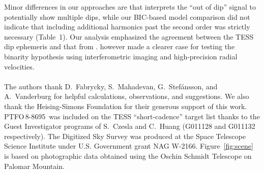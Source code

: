 \documentclass[12pt,twocolumn,tighten]{aastex62}
\newcommand{\ptfo}{PTFO$\,$8-8695}
\begin{document}
Minor differences in our approaches are that \citet{koen_2020}
interprets the ``out of dip'' signal to potentially show multiple
dips, while our BIC-based model comparison did not indicate that
including additional harmonics past the second order was strictly
necessary (Table~1). Our analysis emphasized the agreement between the
TESS dip ephemeris and that from \citet{tanimoto_evidence_2020}.
\citet{koen_2020} however made a clearer case for testing the binarity
hypothesis using interferometric imaging and high-precision radial
velocities.
\\
\\
%
%
%
The authors thank D.~Fabrycky, S.~Mahadevan, G.~Stef\'ansson, and
A.~Vanderburg for helpful calculations, observations, and suggestions.
%
We also thank the Heising-Simons Foundation for
their generous support of this work.
%
\ptfo\ was included on the TESS ``short-cadence'' target list thanks
to the Guest Investigator programs of S.\ Czesla and C.\ Huang
(G011128 and G011132 respectively).
%
The Digitized Sky Survey was produced at the Space Telescope Science
Institute under U.S. Government grant NAG W-2166.
Figure~\ref{fig:scene} is based on photographic data obtained using
the Oschin Schmidt Telescope on Palomar Mountain.
%
\end{document}
